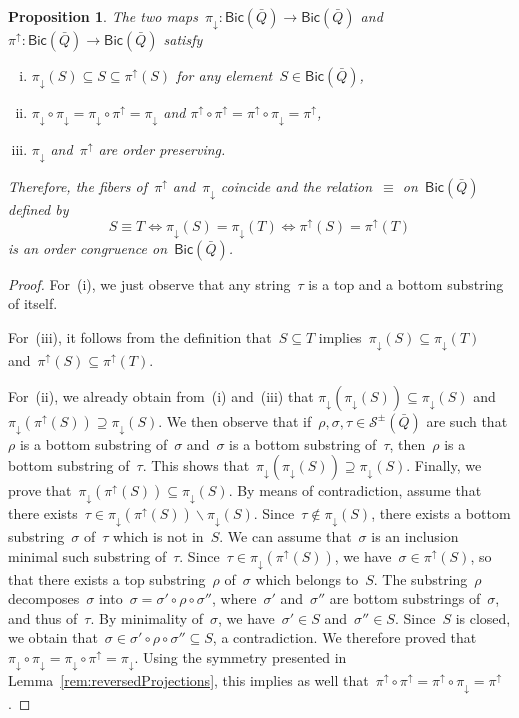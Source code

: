 \documentclass{amsart}
\newtheorem{proposition}[theorem]{Proposition}
\theoremstyle{definition}
\newcommand{\ssm}{\smallsetminus} %
\newcommand{\strings}{\mathcal{S}} %
\newcommand{\Bicl}[1]{\mathsf{Bic}(#1)} %
\newcommand{\projDown}{\pi_\downarrow} %
\newcommand{\projUp}{\pi^\uparrow} %
\begin{document}
\begin{proposition}
\label{prop:latticeCongruence}
The two maps~$\projDown : \Bicl{\bar Q} \to \Bicl{\bar Q}$ and~$\projUp : \Bicl{\bar Q} \to \Bicl{\bar Q}$ satisfy
\begin{enumerate}[(i)]
\item
$\projDown(S) \subseteq S \subseteq \projUp(S)$ for any element~$S \in \Bicl{\bar Q}$,

\item
$\projDown \circ \projDown = \projDown \circ \projUp = \projDown$ and $\projUp \circ \projUp = \projUp \circ \projDown = \projUp$,

\item
$\projDown$ and~$\projUp$ are order preserving.
\end{enumerate}
Therefore, the fibers of~$\projUp$ and~$\projDown$ coincide and the relation~$\equiv$ on~$\Bicl{\bar Q}$ defined by
\[
S \equiv T \iff \projDown(S) = \projDown(T) \iff \projUp(S) = \projUp(T)
\]
is an order congruence on~$\Bicl{\bar Q}$.
\end{proposition}

\begin{proof}
For~(i), we just observe that any string~$\tau$ is a top and a bottom substring of itself.

For~(iii), it follows from the definition that~$S \subseteq T$ implies~$\projDown(S) \subseteq \projDown(T)$ and~$\projUp(S) \subseteq \projUp(T)$.

For~(ii), we already obtain from~(i) and~(iii) that $\projDown(\projDown(S)) \subseteq \projDown(S)$ and~$\projDown(\projUp(S)) \supseteq \projDown(S)$.
We then observe that if~$\rho, \sigma, \tau \in \strings^\pm(\bar Q)$ are such that $\rho$ is a bottom substring of~$\sigma$ and~$\sigma$ is a bottom substring of~$\tau$, then~$\rho$ is a bottom substring of~$\tau$.
This shows that~$\projDown(\projDown(S)) \supseteq \projDown(S)$.
Finally, we prove that~$\projDown(\projUp(S)) \subseteq \projDown(S)$.
By means of contradiction, assume that there exists~${\tau \in \projDown(\projUp(S)) \ssm \projDown(S)}$.
Since~$\tau \notin \projDown(S)$, there exists a bottom substring~$\sigma$ of~$\tau$ which is not in~$S$.
We can assume that~$\sigma$ is an inclusion minimal such substring of~$\tau$.
Since~$\tau \in \projDown(\projUp(S))$, we have~$\sigma \in \projUp(S)$, so that there exists a top substring~$\rho$ of~$\sigma$ which belongs to~$S$.
The substring~$\rho$ decomposes~$\sigma$ into~$\sigma = \sigma' \circ \rho \circ \sigma''$, where~$\sigma'$ and~$\sigma''$ are bottom substrings of~$\sigma$, and thus of~$\tau$.
By minimality of~$\sigma$, we have~$\sigma' \in S$ and~$\sigma'' \in S$.
Since~$S$ is closed, we obtain that~$\sigma \in \sigma' \circ \rho \circ \sigma'' \subseteq S$, a contradiction.
We therefore proved that~$\projDown \circ \projDown = \projDown \circ \projUp = \projDown$.
Using the symmetry presented in Lemma~\ref{rem:reversedProjections}, this implies as well that~$\projUp \circ \projUp = \projUp \circ \projDown = \projUp$.
\end{proof}
\end{document}
